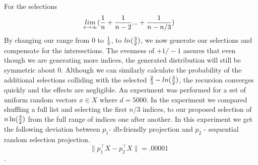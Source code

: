 \noindent
For the selections $$\underset{x\to\infty}{lim}({1\over n}+{1\over {n-2}}...+{1\over{n-n/3}})$$
By changing our range from 0 to \(1\over3\), to $ln({3\over2})$, we now generate our selections and
compensate for the intersections.  The evenness of $+1/-1$ assures that even though we are
generating more indices, the generated distribution will still be symmetric about 0.  Although we can
similarly calculate the probability of the additional selections colliding with the selected
${2\over3} - ln({3\over2})$, the recursion converges quickly and the effects are negligible.  An experiment
was performed for a set of uniform random vectors $x\in X $ where $d=5000$. In the experiment we compared shuffling 
a full list and selecting the first $n/3$ indices, to our proposed selection of $n\ln({3\over2})$ from the full 
range of indices one after another. In this experiment we get the following deviation between $p_1$- db-friendly 
projection and $p_2$ - sequential random selection projection.
$$\|p_1^{\intercal}X - p_2^{\intercal}X\|=.00001$$. 